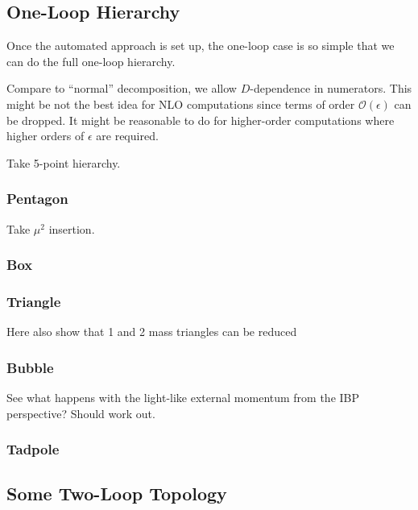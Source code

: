 \subsection{One-Loop Hierarchy}

Once the automated approach is set up, the one-loop case is so simple that we can
do the full one-loop hierarchy.

Compare to ``normal'' decomposition, we allow $D$-dependence in numerators. This might be not the best
idea for NLO computations since terms of order $\mathcal{O}(\epsilon)$ can be dropped.
It might be reasonable to do for higher-order computations where higher orders of $\epsilon$ are required.


Take 5-point hierarchy.

\subsubsection{Pentagon}

Take $\mu^2$ insertion.

\subsubsection{Box}

\subsubsection{Triangle}

Here also show that 1 and 2 mass triangles can be reduced

\subsubsection{Bubble}

See what happens with the light-like external momentum from the IBP perspective?
Should work out.

\subsubsection{Tadpole}

\subsection{Some Two-Loop Topology}


